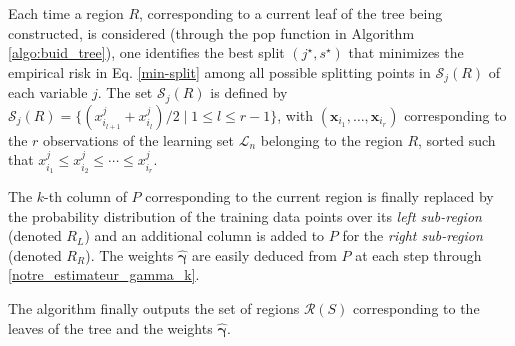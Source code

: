 \documentclass[twoside,11pt]{article}
\begin{document}
Each time a region $R$, corresponding to a current leaf of the tree being constructed, is considered (through the pop function in Algorithm \ref{algo:buid_tree}), one identifies the best split $(j^\star, s^\star)$ that minimizes the empirical risk in Eq. \eqref{min-split} among all possible splitting points in $\mathcal{S}_j(R)$ of each variable $j$. The set $\mathcal{S}_j(R)$ is defined by $\mathcal{S}_j(R) = \{ (x_{i_{l+1}}^j+x_{i_{l}}^j)/2 \mid  {1\leq l \leq r-1}\}$, with $(\boldsymbol{x}_{i_1}, \ldots, \boldsymbol{x}_{i_r})$ corresponding to the $r$ observations of the learning set $\mathcal{L}_n$ belonging to the region $R$, sorted such that $x_{i_1}^j \leq x_{i_2}^j \leq \cdots \leq x_{i_r}^j$.

The $k$-th column of $P$ corresponding to the current region is finally replaced by the probability distribution of the training data points over its \textit{left sub-region} (denoted $R_L$) and an additional column is added to $P$ for the \textit{right sub-region} (denoted $R_R$). The weights $\hat{\boldsymbol{\gamma}}$ are easily deduced from $P$ at each step through \eqref{notre_estimateur_gamma_k}.

The algorithm finally outputs the set of regions $\mathcal{R}(S)$ corresponding to the leaves of the tree and the weights $\hat{\boldsymbol{\gamma}}$.
\end{document}
